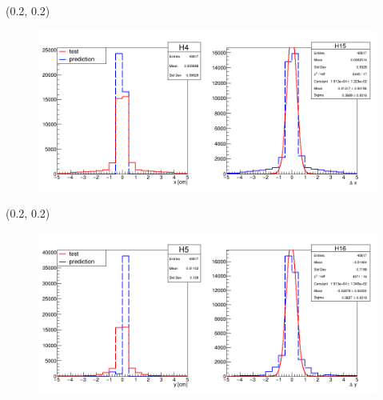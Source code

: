 \documentclass[12pt, xcolor={dvipsnames}, aspectratio = 169]{beamer}
\begin{document}
\begin{frame}

\begin{textblock}{14.0}(0.2, 0.2)
    \begin{figure}
        \centering
        \includegraphics[width=14.0cm]{../imgs/vtx.png}
    \end{figure}
\end{textblock}

\end{frame}

\begin{frame}

\begin{textblock}{14.0}(0.2, 0.2)
    \begin{figure}
        \centering
        \includegraphics[width=14.0cm]{../imgs/vty.png}
    \end{figure}
\end{textblock}

\end{frame}
\end{document}
